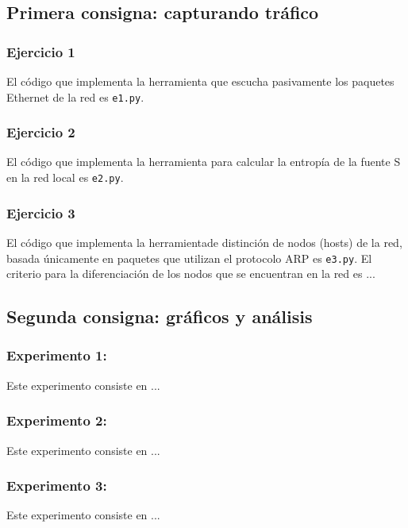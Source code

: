 \subsection{Primera consigna: capturando tráfico}

\subsubsection{Ejercicio 1}
El código que implementa la herramienta que escucha pasivamente los paquetes Ethernet de la red es \texttt{e1.py}.

\subsubsection{Ejercicio 2}
El código que implementa la herramienta para calcular la entropía de la fuente S en la red local es \texttt{e2.py}.

\subsubsection{Ejercicio 3}
El código que implementa la herramientade distinción de nodos (hosts) de la red, basada únicamente en paquetes que
utilizan el protocolo ARP es \texttt{e3.py}. El criterio para la diferenciación de los nodos que se encuentran en
la red es ... %

\subsection{Segunda consigna: gráficos y análisis}

\subsubsection{Experimento 1: }

Este experimento consiste en ... %

\subsubsection{Experimento 2: }

Este experimento consiste en ... %

\subsubsection{Experimento 3: }

Este experimento consiste en ... %
